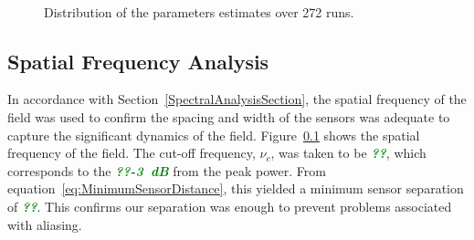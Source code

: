 \documentclass[twocolumn,11pt,a4paper]{article}		%
\newcommand{\omg}[1]{\textsf{\emph{\textbf{\textcolor{green}{#1}}}}}
\begin{document}
\begin{figure}[th]
\\
\caption{Distribution of the parameters estimates over 272
runs.}
\label{fig:Parameters}
\end{figure}
\subsection{Spatial Frequency Analysis} In accordance with Section~\ref{SpectralAnalysisSection}, the spatial frequency of the field was used to confirm the spacing and width of the sensors was adequate to capture the significant dynamics of the field. Figure~\ref{} shows the spatial frequency of the field. The cut-off frequency, $\nu_c$, was taken to be \omg{??}, which corresponds to the \omg{??-3~dB} from the peak power. From equation~\ref{eq:MinimumSensorDistance}, this yielded a minimum sensor separation of \omg{??}. This confirms our separation was enough to prevent problems associated with aliasing.
\end{document}
